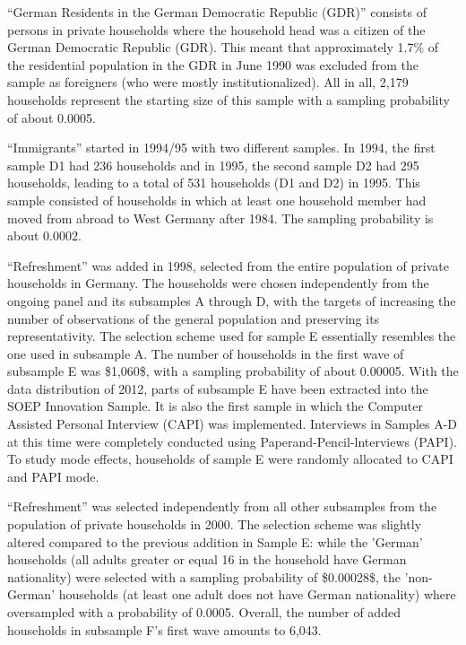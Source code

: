 \documentclass[letterpaper,10pt,openany,onesideH,english]{sphinxmanual}
\begin{document}
 “German Residents in the German Democratic Republic (GDR)” consists of persons in private households where the household head was a citizen of the German Democratic Republic (GDR). This meant that approximately 1.7\% of the residential population in the GDR in June 1990 was excluded from the sample as foreigners (who were mostly institutionalized). All in all, 2,179 households represent the starting size of this sample with a sampling probability of about 0.0005.

 “Immigrants” started in 1994/95 with two different samples. In 1994, the first sample D1 had 236 households and in 1995, the second sample D2 had 295 households, leading to a total of 531 households (D1 and D2) in 1995. This sample consisted of households in which at least one household member had moved from abroad to West Germany after 1984. The sampling probability is about 0.0002.

 “Refreshment” was added in 1998, selected from the entire population of private households in Germany. The households were chosen independently from the ongoing panel and its subsamples A through D, with the targets of increasing the number of observations of the general population and preserving its representativity. The selection scheme used for sample E essentially resembles the one used in subsample A. The number of households in the first wave of subsample E was \$1,060\$, with a sampling probability of about 0.00005. With the data distribution of 2012, parts of subsample E have been extracted into the SOEP Innovation Sample. It is also the first sample in which the Computer Assisted Personal Interview (CAPI) was implemented. Interviews in Samples A-D at this time were completely conducted using Paperand-Pencil-lnterviews (PAPI). To study mode effects, households of sample E were randomly allocated to CAPI and PAPI mode.

 “Refreshment” was selected independently from all other subsamples from the population of private households in 2000. The selection scheme was slightly altered compared to the previous addition in Sample E: while the ’German’ households (all adults greater or equal 16 in the household have German nationality) were selected with a sampling probability of \$0.00028\$, the ’non-German’ households (at least one adult does not have German nationality) where oversampled with a probability of 0.0005. Overall, the number of added households in subsample F’s first wave amounts to 6,043.
\end{document}

